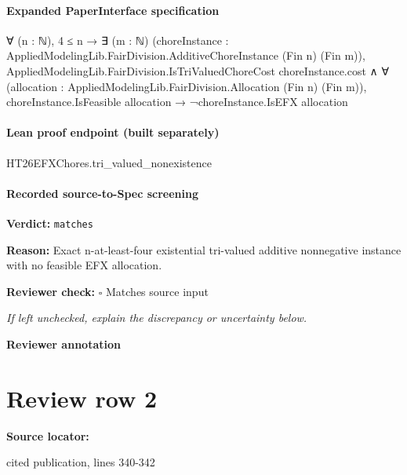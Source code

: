 \documentclass[10pt]{article}
\newcommand{\reviewerbox}{%
  \par\noindent\fbox{\parbox{0.96\linewidth}{\rule{0pt}{0.38in}}}\par
}
\newcommand{\reviewmatch}[1]{%
  \par\noindent\textbf{Reviewer check:} $\square$\; #1\par
  \noindent\emph{If left unchecked, explain the discrepancy or uncertainty below.}\par
}
\begin{document}
\paragraph{Expanded PaperInterface specification}
\begin{ReviewVerbatim}
∀ (n : ℕ),
  4 ≤ n →
    ∃ (m : ℕ) (choreInstance : AppliedModelingLib.FairDivision.AdditiveChoreInstance (Fin n) (Fin m)),
      AppliedModelingLib.FairDivision.IsTriValuedChoreCost choreInstance.cost ∧
        ∀ (allocation : AppliedModelingLib.FairDivision.Allocation (Fin n) (Fin m)),
          choreInstance.IsFeasible allocation → ¬choreInstance.IsEFX allocation
\end{ReviewVerbatim}



\paragraph{Lean proof endpoint (built separately)}\begin{ReviewVerbatim}
HT26EFXChores.tri_valued_nonexistence
\end{ReviewVerbatim}

\paragraph{Recorded source-to-Spec screening}
\textbf{Verdict:} \texttt{matches}
\\
{\raggedright
\textbf{Reason:} Exact n-\allowbreak{}at-\allowbreak{}least-\allowbreak{}four existential tri-\allowbreak{}valued additive nonnegative instance with no feasible EFX allocation.\allowbreak{}
\par}
\reviewmatch{Matches source input}
\noindent\textbf{Reviewer annotation}\par
\reviewerbox
\clearpage
\hypertarget{source-claim-2321d8010acce683}{}
\section*{Review row 2}
\textbf{Source locator:} {\footnotesize\raggedright cited publication, lines 340-\allowbreak{}342\par}
\end{document}
